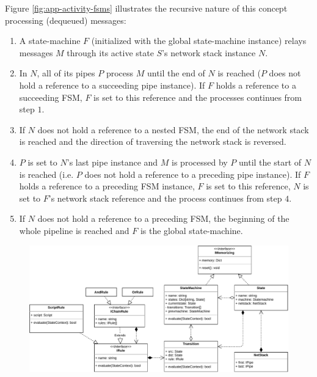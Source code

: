 Figure \ref{fig:app-activity-fsms} illustrates the recursive nature of this concept processing (dequeued) messages:
\begin{enumerate}
    \item A state-machine $F$ (initialized with the global state-machine instance) relays messages $M$ through its active state $S$'s network stack instance $N$.
    \item In $N$, all of its pipes $P$ process $M$ until the end of $N$ is reached ($P$ does not hold a reference to a succeeding pipe instance). If $F$ holds a reference to a succeeding \ac{FSM}, $F$ is set to this reference and the processes continues from step $1$.
    \item If $N$ does not hold a reference to a nested \ac{FSM}, the end of the network stack is reached and the direction of traversing the network stack is reversed.
    \item $P$ is set to $N$'s last pipe instance and $M$ is processed by $P$ until the start of $N$ is reached (i.e. $P$ does not hold a reference to a preceding pipe instance). If $F$ holds a reference to a preceding \ac{FSM} instance, $F$ is set to this reference, $N$ is set to $F$'s network stack reference and the process continues from step $4$.
    \item If $N$ does not hold a reference to a preceding \ac{FSM}, the beginning of the whole pipeline is reached and $F$ is the global state-machine.
\end{enumerate}

\begin{figure}[h]
    \centering
    \includegraphics[width=14cm]{img/ch05/classes-1-fsm-rules-netstack.pdf}
    \label{fig:classes-1-fsm-rules-netstack}
\end{figure}
